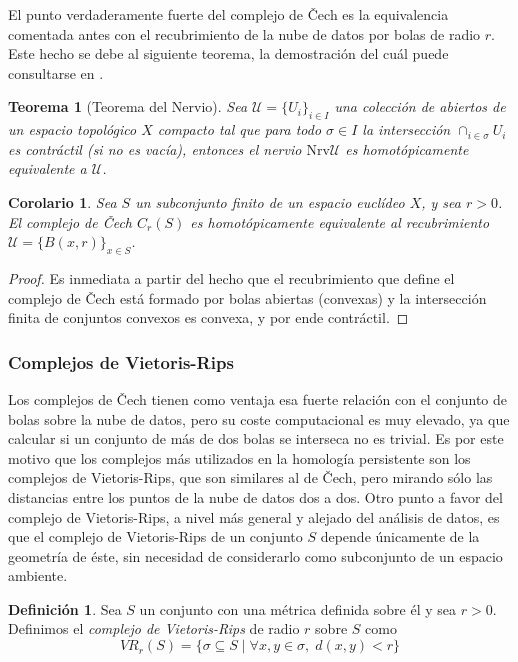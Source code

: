 \documentclass[12pt,a4paper,twoside]{article} %
\theoremstyle{plain}
\newtheorem{teorema}{Teorema}[subsection]
\newtheorem{corolario}{Corolario}[subsection]
\theoremstyle{definition}
\newtheorem{definicion}{Definición}[subsection]
\newcommand{\NrvU}{\mathrm{Nrv}\mathcal{U}}
\newcommand{\tq}{\; | \;}
\newcommand{\U}{\mathcal{U}}
\begin{document}
El punto verdaderamente fuerte del complejo de Čech es la equivalencia comentada antes con el recubrimiento de la nube de datos por bolas de radio $r$. Este hecho se debe al siguiente teorema, la demostración del cuál puede consultarse en \cite{Bjorner}.

\begin{teorema}[Teorema del Nervio]
Sea $\U = \{ U_i \}_{i\in I}$ una colección de abiertos de un espacio topológico $X$ compacto tal que para todo $\sigma \in I$ la intersección $\cap_{i\in\sigma}U_i$ es contráctil (si no es vacía), entonces el nervio $\NrvU$ es homotópicamente equivalente a $\U$.
\end{teorema}

\begin{corolario}
Sea $S$ un subconjunto finito de un espacio euclídeo $X$, y sea $r > 0$. El complejo de Čech $C_r(S)$ es homotópicamente equivalente al recubrimiento $\U = \{ B(x,r) \}_{x\in S}$.
\end{corolario}

\begin{proof}
Es inmediata a partir del hecho que el recubrimiento que define el complejo de Čech está formado por bolas abiertas (convexas) y la intersección finita de conjuntos convexos es convexa, y por ende contráctil.
\end{proof}

\subsubsection{Complejos de Vietoris-Rips}
Los complejos de Čech tienen como ventaja esa fuerte relación con el conjunto de bolas sobre la nube de datos, pero su coste computacional es muy elevado, ya que calcular si un conjunto de más de dos bolas se interseca no es trivial. Es por este motivo que los complejos más utilizados en la homología persistente son los complejos de Vietoris-Rips, que son similares al de Čech, pero mirando sólo las distancias entre los puntos de la nube de datos dos a dos. Otro punto a favor del complejo de Vietoris-Rips, a nivel más general y alejado del análisis de datos, es que el complejo de Vietoris-Rips de un conjunto $S$ depende únicamente de la geometría de éste, sin necesidad de considerarlo como subconjunto de un espacio ambiente.

\begin{definicion}
Sea $S$ un conjunto con una métrica definida sobre él y sea $r > 0$. Definimos el \emph{complejo de Vietoris-Rips} de radio $r$ sobre $S$ como
$$  VR_r(S) = \lbrace \sigma \subseteq S \tq \forall x,y \in \sigma, \; d(x,y) < r \rbrace  $$
\end{definicion}
\end{document}
